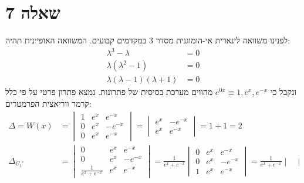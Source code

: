 \documentclass{article}
\begin{document}
\section*{שאלה 7}
לפנינו משוואה לינארית אי-הומוגנית מסדר 3 במקדמים קבועים. המשוואה האופיינית תהיה:
\begin{align*}
    \lambda^3-\lambda             & =0 \\
    \lambda(\lambda^2-1)          & =0 \\
    \lambda(\lambda-1)(\lambda+1) & =0
\end{align*}
ונקבל כי $e^{0x}\equiv1, e^{x}, e^{-x}$ מהווים מערכת בסיסית של פתרונות. נמצא פתרון פרטי על פי כלל קרמר ווריאצית הפרמטרים:
\begin{align*}
    \Delta = W(x) & = \begin{vmatrix}
                          1 & e^{x} & e^{-x}  \\
                          0 & e^{x} & -e^{-x} \\
                          0 & e^{x} & e^{-x}
                      \end{vmatrix} = \begin{vmatrix}
                                          e^{x} & -e^{-x} \\
                                          e^{x} & e^{-x}
                                      \end{vmatrix}=1+1=2                                                                                                             \\
    \Delta_{C_1'} & = \begin{vmatrix}
                          0                    & e^{x} & e^{-x}  \\
                          0                    & e^{x} & -e^{-x} \\
                          \frac{1}{e^x+e^{-x}} & e^{x} & e^{-x}
                      \end{vmatrix} = \frac{1}{e^x+e^{-x}} \begin{vmatrix}
                                                               0 & e^{x} & e^{-x}  \\
                                                               0 & e^{x} & -e^{-x} \\
                                                               1 & e^{x} & e^{-x}
                                                           \end{vmatrix} =
    \frac{1}{e^x+e^{-x}} \begin{vmatrix}

\end{vmatrix}
\end{align*}
\end{document}
